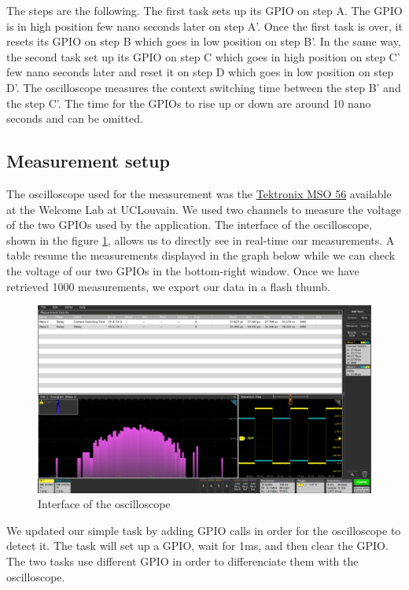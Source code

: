 The steps are the following.
The first task sets up its GPIO on step A.
The GPIO is in high position few nano seconds later on step A'.
Once the first task is over, it resets its GPIO on step B which goes in low position on step B'.
In the same way, the second task set up its GPIO on step C which goes in high position on step C' few nano seconds later and reset it on step D which goes in low position on step D'.
The oscilloscope measures the context switching time between the step B' and the step C'.
The time for the GPIOs to rise up or down are around 10 nano seconds and can be omitted.


\subsection{Measurement setup}

The oscilloscope used for the measurement was the \href{https://www.tek.com/oscilloscope/mso56}{Tektronix MSO 56} available at the Welcome Lab at UCLouvain.
We used two channels to measure the voltage of the two GPIOs used by the application.
The interface of the oscilloscope, shown in the figure \ref{fig:oscilloscope-interface}, allows us to directly see in real-time our measurements.
A table resume the measurements displayed in the graph below while we can check the voltage of our two GPIOs in the bottom-right window.
Once we have retrieved 1000 measurements, we export our data in a flash thumb.

\begin{figure}[!ht]
    \centering
    \includegraphics[scale=0.25]{assets/oscilloscope-interface.png}
    \caption{Interface of the oscilloscope\label{fig:oscilloscope-interface}}
\end{figure}

We updated our simple task by adding GPIO calls in order for the oscilloscope to detect it.
The task will set up a GPIO, wait for 1ms, and then clear the GPIO.
The two tasks use different GPIO in order to differenciate them with the oscilloscope.

